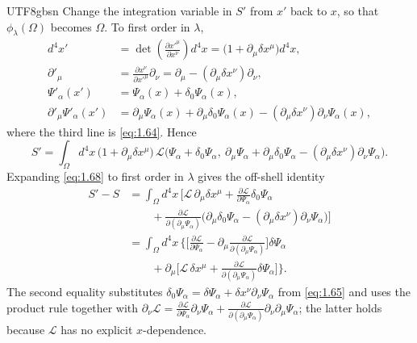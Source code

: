 \documentclass[11pt,a4paper,oneside]{report}
\begin{document}
\begin{CJK*}{UTF8}{gbsn}
Change the integration variable in $S'$ from $x'$ back to $x$, so that $\phi_\lambda(\Omega)$ becomes $\Omega$. To first order in $\lambda$,
\begin{equation*}
\begin{aligned}
d^4x'
&=\det\!\left(\frac{\partial x'^\mu}{\partial x^\nu}\right)d^4x
=\bigl(1+\partial_\mu\delta x^\mu\bigr)d^4x,\\
\partial'_\mu
&=\frac{\partial x^\nu}{\partial x'^\mu}\partial_\nu
=\partial_\mu-(\partial_\mu\delta x^\nu)\partial_\nu,\\
\Psi'_\alpha(x')
&=\Psi_\alpha(x)+\delta_0\Psi_\alpha(x),\\
\partial'_\mu\Psi'_\alpha(x')
&=\partial_\mu\Psi_\alpha(x)
+\partial_\mu\delta_0\Psi_\alpha(x)
-(\partial_\mu\delta x^\nu)\partial_\nu\Psi_\alpha(x),
\end{aligned}
\tag{1.67}\label{eq:1.67}
\end{equation*}
where the third line is \eqref{eq:1.64}. Hence
\begin{equation*}
S'=\int_\Omega d^4x\,
\bigl(1+\partial_\mu\delta x^\mu\bigr)\,
\mathcal L\bigl(
\Psi_\alpha+\delta_0\Psi_\alpha,\
\partial_\mu\Psi_\alpha
+\partial_\mu\delta_0\Psi_\alpha
-(\partial_\mu\delta x^\nu)\partial_\nu\Psi_\alpha
\bigr).
\tag{1.68}\label{eq:1.68}
\end{equation*}
Expanding \eqref{eq:1.68} to first order in $\lambda$ gives the off-shell identity
\begin{equation*}
\begin{aligned}
S'-S
&=\int_\Omega d^4x\,\biggl[
\mathcal L\,\partial_\mu\delta x^\mu
+\frac{\partial\mathcal L}{\partial\Psi_\alpha}\delta_0\Psi_\alpha\\
&\qquad
+\frac{\partial\mathcal L}{\partial(\partial_\mu\Psi_\alpha)}
\bigl(\partial_\mu\delta_0\Psi_\alpha-(\partial_\mu\delta x^\nu)\partial_\nu\Psi_\alpha\bigr)
\biggr]\\
&=\int_\Omega d^4x\,\biggl\{
\biggl[
\frac{\partial\mathcal L}{\partial\Psi_\alpha}
-\partial_\mu\frac{\partial\mathcal L}{\partial(\partial_\mu\Psi_\alpha)}
\biggr]\delta\Psi_\alpha\\
&\qquad
+\partial_\mu\biggl[
\mathcal L\,\delta x^\mu
+\frac{\partial\mathcal L}{\partial(\partial_\mu\Psi_\alpha)}\delta\Psi_\alpha
\biggr]
\biggr\}.
\end{aligned}
\tag{1.69}\label{eq:1.69}
\end{equation*}
The second equality substitutes $\delta_0\Psi_\alpha=\delta\Psi_\alpha+\delta x^\nu\partial_\nu\Psi_\alpha$ from \eqref{eq:1.65} and uses the product rule together with $\partial_\nu\mathcal L=\frac{\partial\mathcal L}{\partial\Psi_\alpha}\partial_\nu\Psi_\alpha+\frac{\partial\mathcal L}{\partial(\partial_\mu\Psi_\alpha)}\partial_\nu\partial_\mu\Psi_\alpha$; the latter holds because $\mathcal L$ has no explicit $x$-dependence.


\end{CJK*}
\end{document}

